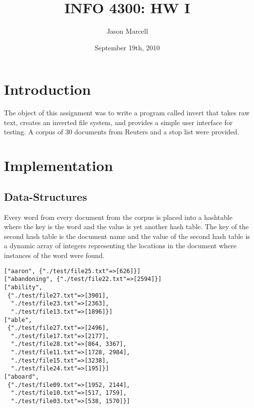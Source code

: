 \documentclass[12pt]{article}
\title{INFO 4300: HW I}
\author{Jason Marcell}
\date{September 19th, 2010}
\begin{document}
 
\maketitle 
\newpage
\section{Introduction} %
\label{sec:introduction}
The object of this assignment was to write a program called invert that takes raw text, creates an inverted file system, and provides a simple user interface for testing. A corpus of 30 documents from Reuters and a stop list were provided.
\section{Implementation} %
\label{sec:implementation}
\subsection{Data-Structures} %
\label{sub:datastructures}
Every word from every document from the corpus is placed into a hashtable where the key is the word and the value is yet another hash table. The key of the second hash table is the document name and the value of the second hash table is a dynamic array of integers representing the locations in the document where instances of the word were found.
\lstset{caption=A small sample of the word listing index. The word ``aboard'' was found twice in three documents each.}
\begin{lstlisting}
["aaron", {"./test/file25.txt"=>[626]}]
["abandoning", {"./test/file22.txt"=>[2594]}]
["ability",
 {"./test/file27.txt"=>[3901],
  "./test/file23.txt"=>[2363],
  "./test/file13.txt"=>[1896]}]
["able",
 {"./test/file27.txt"=>[2496],
  "./test/file17.txt"=>[2177],
  "./test/file28.txt"=>[864, 3367],
  "./test/file11.txt"=>[1728, 2984],
  "./test/file15.txt"=>[3238],
  "./test/file24.txt"=>[195]}]
["aboard",
 {"./test/file09.txt"=>[1952, 2144],
  "./test/file10.txt"=>[517, 1759],
  "./test/file03.txt"=>[538, 1570]}]
\end{lstlisting}
\pagebreak
\end{document}
